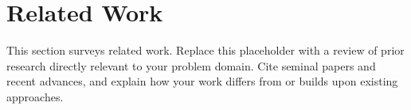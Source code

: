 
\section{Related Work}


This section surveys related work. Replace this placeholder with a review
of prior research directly relevant to your problem domain.
Cite seminal papers and recent advances, and explain how your work differs
from or builds upon existing approaches.
